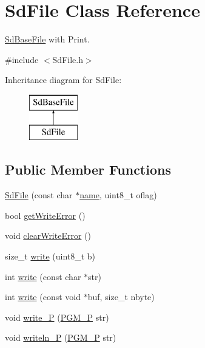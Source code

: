 \hypertarget{class_sd_file}{}\section{Sd\+File Class Reference}
\label{class_sd_file}


\hyperlink{class_sd_base_file}{Sd\+Base\+File} with Print.  




{\ttfamily \#include $<$Sd\+File.\+h$>$}

Inheritance diagram for Sd\+File\+:\begin{figure}[H]
\begin{center}
\leavevmode
\includegraphics[height=2.000000cm]{class_sd_file}
\end{center}
\end{figure}
\subsection*{Public Member Functions}
\begin{DoxyCompactItemize}
\item 
\hyperlink{class_sd_file_acacaaf3201d9eb149183cf52f1f139a5}{Sd\+File} (const char $\ast$\hyperlink{_sd_fat_structs_8h_a30308c9b983377042fd2cc8900454fb1}{name}, uint8\+\_\+t oflag)
\item 
bool \hyperlink{class_sd_file_adfb128479bcdc998b09151b2c47e828f}{get\+Write\+Error} ()
\item 
void \hyperlink{class_sd_file_ac9898f5e004588267d8a31762ac47e60}{clear\+Write\+Error} ()
\item 
size\+\_\+t \hyperlink{class_sd_file_a67267a4b63d03a16e099195935613006}{write} (uint8\+\_\+t b)
\item 
int \hyperlink{class_sd_file_a489af4bffef36ee4c22d422ba68b1b00}{write} (const char $\ast$str)
\item 
int \hyperlink{class_sd_file_a7329a9bde292b3baad6d6dfbd72afe90}{write} (const void $\ast$buf, size\+\_\+t nbyte)
\item 
void \hyperlink{class_sd_file_adaa153fed109a0a03cfd545a259de4fe}{write\+\_\+P} (\hyperlink{_sd_base_file_8h_a963f816fc88a5d8479c285ed4c630229}{P\+G\+M\+\_\+P} str)
\item 
void \hyperlink{class_sd_file_ad760d51410f36fd1e1b005a754624954}{writeln\+\_\+P} (\hyperlink{_sd_base_file_8h_a963f816fc88a5d8479c285ed4c630229}{P\+G\+M\+\_\+P} str)
\end{DoxyCompactItemize}
